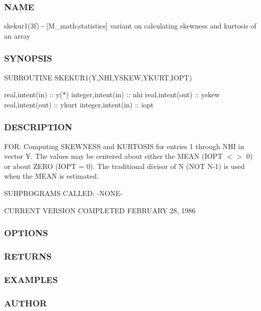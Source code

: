 \subsubsection*{N\+A\+ME}

skekur1(3f) -\/ \mbox{[}M\+\_\+math\+:statistics\mbox{]} variant on calculating skewness and kurtosis of an array 

\subsubsection*{S\+Y\+N\+O\+P\+S\+IS}

\begin{DoxyVerb}SUBROUTINE SKEKUR1(Y,NHI,YSKEW,YKURT,IOPT)

 real,intent(in)    ::  y(*)
 integer,intent(in) :: nhi
 real,intent(out)   :: yskew
 real,intent(out)   :: ykurt
 integer,intent(in) :: iopt
\end{DoxyVerb}


\subsubsection*{D\+E\+S\+C\+R\+I\+P\+T\+I\+ON}

F\+OR\+: Computing S\+K\+E\+W\+N\+E\+SS and K\+U\+R\+T\+O\+S\+IS for entries 1 through N\+HI in vector Y. The values may be centered about either the M\+E\+AN (I\+O\+PT $<$$>$ 0) or about Z\+E\+RO (I\+O\+PT = 0). The traditional divisor of N (N\+OT N-\/1) is used when the M\+E\+AN is estimated.

S\+U\+B\+P\+R\+O\+G\+R\+A\+MS C\+A\+L\+L\+ED\+: -\/\+N\+O\+N\+E-\/

C\+U\+R\+R\+E\+NT V\+E\+R\+S\+I\+ON C\+O\+M\+P\+L\+E\+T\+ED F\+E\+B\+R\+U\+A\+RY 28, 1986 \subsubsection*{O\+P\+T\+I\+O\+NS}

\subsubsection*{R\+E\+T\+U\+R\+NS}

\subsubsection*{E\+X\+A\+M\+P\+L\+ES}

\subsubsection*{A\+U\+T\+H\+OR}

